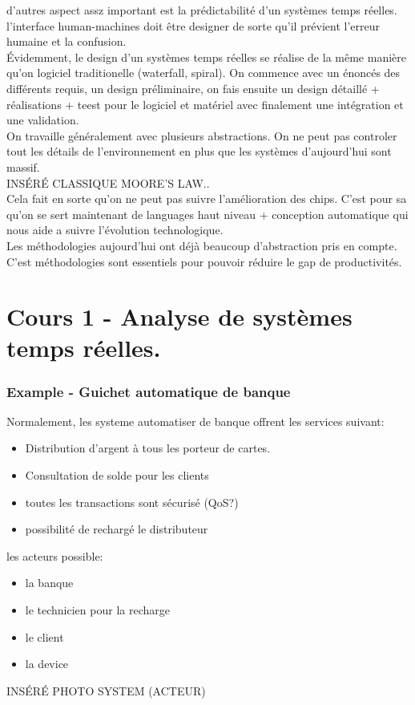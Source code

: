 \documentclass[oneside]{book}
\begin{document}
    d'autres aspect assz important est la prédictabilité d'un systèmes temps réelles. l'interface human-machines doit être designer de sorte qu'il prévient l'erreur humaine et la confusion.\\
    
    Évidemment, le design d'un systèmes temps réelles se réalise de la même manière qu'on logiciel traditionelle (waterfall, spiral). On commence avec un énoncés des différents requis, un design préliminaire, on fais ensuite un design détaillé + réalisations + teest pour le logiciel et matériel avec finalement une intégration et une validation.\\
    
    On travaille généralement avec plusieurs abstractions. On ne peut pas controler tout les détails de l'environnement en plus que les systèmes d'aujourd'hui sont massif.\\
    
    INSÉRÉ CLASSIQUE MOORE'S LAW..\\
    
    Cela fait en sorte qu'on ne peut pas suivre l'amélioration des chips. C'est pour sa qu'on se sert maintenant de languages haut niveau + conception automatique qui nous aide a suivre l'évolution technologique.\\
    
    Les méthodologies aujourd'hui ont déjà beaucoup d'abstraction pris en compte. C'est méthodologies sont essentiels pour pouvoir réduire le gap de productivités.\\
    
     
    \chapter{Cours 1 - Analyse de systèmes temps réelles.}
    \subsection{Example - Guichet automatique de banque}
    Normalement, les systeme automatiser de banque offrent les services suivant:
    \begin{itemize}
        \item Distribution d'argent à tous les porteur de cartes.
        \item Consultation de solde pour les clients
        \item toutes les transactions sont sécurisé (QoS?)
        \item possibilité de rechargé le distributeur
    \end{itemize}
    les acteurs possible:
    \begin{itemize}
        \item la banque
        \item le technicien pour la recharge
        \item le client
        \item la device
    \end{itemize}
    INSÉRÉ PHOTO SYSTEM (ACTEUR)\\
    
\end{document}
